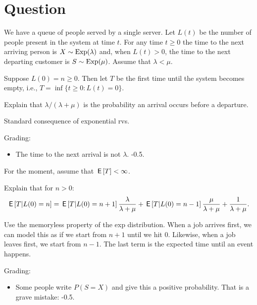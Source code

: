 \section{Question}



We have a queue of people served by a single server. Let $L(t)$ be the number of people present in the system at time $t$.
For any time $t\geq 0$ the time to the next arriving person is $X\sim\mathrm{Exp}(\lambda)$ and, when $L(t)>0$, the time to the next departing customer is $S\sim\mathrm{Exp}(\mu)$. Assume that $\lambda < \mu$.

Suppose $L(0)=n\geq 0$. Then let $T$ be the first time until the system becomes empty, i.e., $T=\inf\{t\geq 0 : L(t) = 0\}$.


\begin{exercise}[1]
Explain that $\lambda/(\lambda+\mu)$ is the probability an arrival occurs before a departure.
\begin{solution}
  Standard consequence of exponential rvs.

Grading:
\begin{itemize}
\item The time to the next arrival is not $\lambda$. -0.5.
\end{itemize}
\end{solution}
\end{exercise}

For the moment, assume that $\,\mathsf{E}\left[T\right] < \infty$.

\begin{exercise}[1]
Explain that  for $n>0$:
\begin{equation}
\,\mathsf{E}\left[T|L(0)=n\right]   = \,\mathsf{E}\left[T|L(0)=n+1\right] \frac{\lambda}{\lambda + \mu} +\,\mathsf{E}\left[T|L(0)=n-1\right] \frac{\mu}{\lambda + \mu} +\frac{1}{\lambda + \mu}.
\end{equation}
\begin{solution}
Use the memoryless property of the exp distribution. When a job arrives first, we can model this as if we start from $n+1$ until we hit $0$. Likewise, when a job leaves first, we start from $n-1$. The last term is the expected time until an event happens.

Grading:
\begin{itemize}
\item Some people write $P(S=X)$ and give this a positive probability. That is a grave mistake: -0.5.
\end{itemize}
\end{solution}
\end{exercise}

